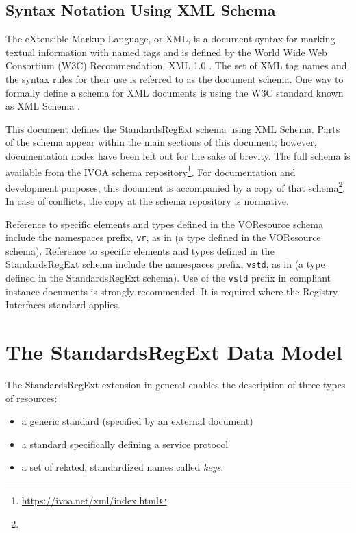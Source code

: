 \documentclass[11pt,a4paper]{ivoa}
\begin{document}
\subsection{Syntax Notation Using XML Schema}
The eXtensible Markup Language, or XML, is a document syntax for marking
textual information with named tags and is defined by the
World Wide Web Consortium (W3C) Recommendation,
XML 1.0 \citep{std:XML}.
The set of XML tag names and the syntax
rules for their use is referred to as the document schema.  One way to
formally define a schema for XML documents is using the W3C standard
known as XML Schema \citep{std:XSD}.


This document defines the StandardsRegExt schema using XML Schema.
Parts of the schema appear within the main sections of this document;
however, documentation nodes have been left out for the sake of brevity.
The full schema is available from the IVOA schema
repository\footnote{\url{https://ivoa.net/xml/index.html}}.  For
documentation and development purposes, this document is accompanied by
a copy of that
schema\footnote{}.  In case of
conflicts, the copy at the schema repository is normative.

Reference to specific elements and types defined in the VOResource
schema include the namespaces prefix, \texttt{vr}, as in
 (a type defined in the VOResource schema).
Reference to specific elements and types defined in the StandardsRegExt
schema include the namespaces prefix, \texttt{vstd}, as in
 (a type defined in the StandardsRegExt schema).
Use of the \texttt{vstd} prefix in compliant instance documents is 
strongly recommended.  It is required where the Registry Interfaces
standard \citep{2018ivoa.spec.0723D} applies.




\section{The StandardsRegExt Data Model}

The StandardsRegExt extension in general enables the description of three
types of resources:

\begin{itemize}
\item  a generic standard (specified by an external document)
\item  a standard specifically defining a service protocol
\item  a set of related, standardized names called \emph{keys}.
\end{itemize}
\end{document}
